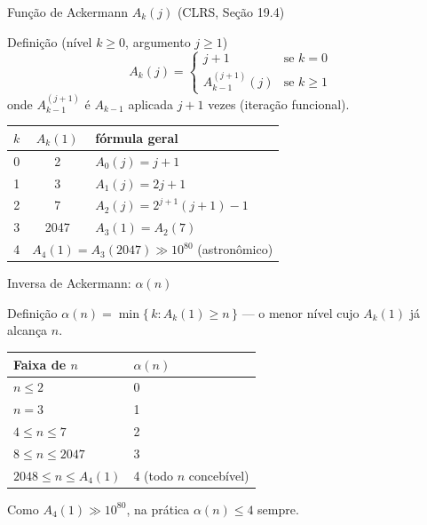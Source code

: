 \documentclass[aspectratio=169]{beamer}
\begin{document}
\begin{frame}[shrink=20]{Função de Ackermann $A_k(j)$ (CLRS, Seção 19.4)}%
  \begin{block}{Definição (nível $k\geq 0$, argumento $j\geq 1$)}
    \[
      A_k(j) =
      \begin{cases}
        j+1                 & \text{se } k = 0 \\[2pt]
        A_{k-1}^{(j+1)}(j)  & \text{se } k \geq 1
      \end{cases}
    \]
    onde $A_{k-1}^{(j+1)}$ é $A_{k-1}$ aplicada $j+1$ vezes (iteração funcional).
  \end{block}
  \vspace{0.2cm}
  \begin{center}
  \renewcommand{\arraystretch}{1.3}
  \begin{tabular}{ccl}
    \toprule
    $k$ & $A_k(1)$ & fórmula geral \\
    \midrule
    0 & 2    & $A_0(j) = j+1$ \\
    1 & 3    & $A_1(j) = 2j+1$ \\
    2 & 7    & $A_2(j) = 2^{j+1}(j+1)-1$ \\
    3 & 2047 & $A_3(1) = A_2(7)$ \\
    4 & \multicolumn{2}{l}{$A_4(1) = A_3(2047) \gg 10^{80}$ (astronômico)} \\
    \bottomrule
  \end{tabular}
  \end{center}
\end{frame}

\begin{frame}[shrink=20]{Inversa de Ackermann: $\alpha(n)$}%
  \begin{block}{Definição}
    $\alpha(n) = \min\{\,k : A_k(1) \geq n\,\}$ \quad — o menor nível cujo $A_k(1)$ já alcança $n$.
  \end{block}
  \vspace{0.3cm}
  \begin{center}
  \renewcommand{\arraystretch}{1.3}
  \begin{tabular}{ll}
    \toprule
    \textbf{Faixa de $n$} & $\alpha(n)$ \\
    \midrule
    $n \leq 2$                 & 0 \\
    $n = 3$                    & 1 \\
    $4 \leq n \leq 7$          & 2 \\
    $8 \leq n \leq 2047$       & 3 \\
    $2048 \leq n \leq A_4(1)$  & 4 \quad(todo $n$ concebível) \\
    \bottomrule
  \end{tabular}
  \end{center}
  \vspace{0.3cm}
  \begin{center}
    Como $A_4(1) \gg 10^{80}$, na prática $\alpha(n) \leq 4$ sempre.
  \end{center}
\end{frame}
\end{document}
